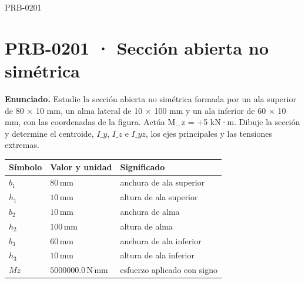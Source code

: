 \begin{studiumworked}{PRB-0201}

\section{PRB-0201 · Sección abierta no simétrica}

\textbf{Enunciado.} Estudie la sección abierta no simétrica formada por un ala superior de 80 \ensuremath{\times} 10 mm, un alma lateral de 10 \ensuremath{\times} 100 mm y un ala inferior de 60 \ensuremath{\times} 10 mm, con las coordenadas de la figura. Actúa M\_z = +5 kN·m. Dibuje la sección y determine el centroide, \(I\_y\), \(I\_z\) e \(I\_{yz}\), los ejes principales y las tensiones extremas.

\par\medskip\noindent\begin{tabular}{@{}p{.18\linewidth}p{.26\linewidth}p{.48\linewidth}@{}}
\toprule Símbolo & Valor y unidad & Significado\\\midrule
$b_{1}$ & $80\,\mathrm{mm}$ & anchura de ala superior\\
$h_{1}$ & $10\,\mathrm{mm}$ & altura de ala superior\\
$b_{2}$ & $10\,\mathrm{mm}$ & anchura de alma\\
$h_{2}$ & $100\,\mathrm{mm}$ & altura de alma\\
$b_{3}$ & $60\,\mathrm{mm}$ & anchura de ala inferior\\
$h_{3}$ & $10\,\mathrm{mm}$ & altura de ala inferior\\
$Mz$ & $5000000.0\,\mathrm{N\,mm}$ & esfuerzo aplicado con signo\\
\bottomrule\end{tabular}\par\medskip


\end{studiumworked}
